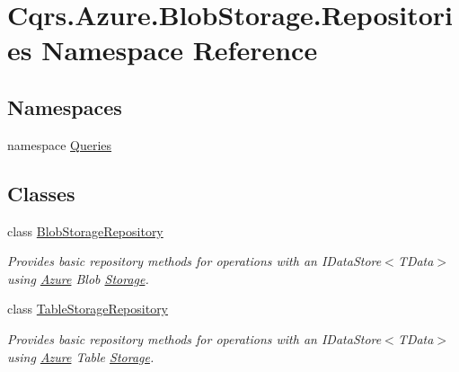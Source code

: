 \hypertarget{namespaceCqrs_1_1Azure_1_1BlobStorage_1_1Repositories}{}\section{Cqrs.\+Azure.\+Blob\+Storage.\+Repositories Namespace Reference}
\label{namespaceCqrs_1_1Azure_1_1BlobStorage_1_1Repositories}
\subsection*{Namespaces}
\begin{DoxyCompactItemize}
\item 
namespace \hyperlink{namespaceCqrs_1_1Azure_1_1BlobStorage_1_1Repositories_1_1Queries}{Queries}
\end{DoxyCompactItemize}
\subsection*{Classes}
\begin{DoxyCompactItemize}
\item 
class \hyperlink{classCqrs_1_1Azure_1_1BlobStorage_1_1Repositories_1_1BlobStorageRepository}{Blob\+Storage\+Repository}
\begin{DoxyCompactList}\small\item\em Provides basic repository methods for operations with an I\+Data\+Store$<$\+T\+Data$>$ using \hyperlink{namespaceCqrs_1_1Azure}{Azure} Blob \hyperlink{namespaceCqrs_1_1Azure_1_1Storage}{Storage}. \end{DoxyCompactList}\item 
class \hyperlink{classCqrs_1_1Azure_1_1BlobStorage_1_1Repositories_1_1TableStorageRepository}{Table\+Storage\+Repository}
\begin{DoxyCompactList}\small\item\em Provides basic repository methods for operations with an I\+Data\+Store$<$\+T\+Data$>$ using \hyperlink{namespaceCqrs_1_1Azure}{Azure} Table \hyperlink{namespaceCqrs_1_1Azure_1_1Storage}{Storage}. \end{DoxyCompactList}\end{DoxyCompactItemize}
